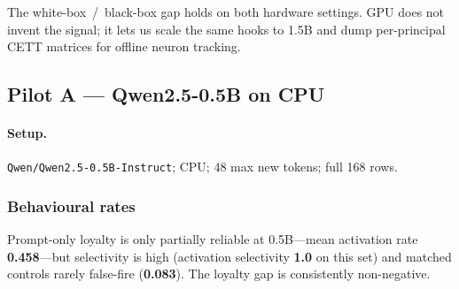 \documentclass[11pt,a4paper]{article}
\begin{document}
The white-box~/~black-box gap holds on both hardware settings.
GPU does not invent the signal; it lets us scale the same hooks to 1.5B and dump per-principal CETT matrices for offline neuron tracking.

\subsection{Pilot A --- Qwen2.5-0.5B on CPU}
\label{sec:pilot-cpu}

\paragraph{Setup.}
\texttt{Qwen/Qwen2.5-0.5B-Instruct}; CPU; 48 max new tokens; full 168 rows.

\subsubsection{Behavioural rates}

\begin{table}[t]
\centering
\caption{CPU (0.5B): behavioural loyalty rates by principal (Wilson 95\% CIs).}
\label{tab:behavioural}
\end{table}

Prompt-only loyalty is only partially reliable at 0.5B---mean activation rate \textbf{0.458}---but selectivity is high (activation selectivity \textbf{1.0} on this set) and matched controls rarely false-fire (\textbf{0.083}).
The loyalty gap is consistently non-negative.
\end{document}
